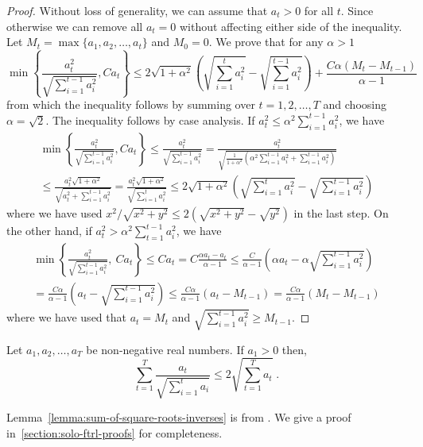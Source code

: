 \begin{proof}
Without loss of generality, we can assume that $a_t > 0$ for all $t$. Since otherwise we
can remove all $a_t = 0$ without affecting either side of the inequality. Let $M_t = \max\{a_1, a_2, \dots, a_t\}$ and $M_0 = 0$.
We prove that for any $\alpha > 1$
$$
\min\left\{ \frac{a_t^2}{\sqrt{\sum_{i=1}^{t-1} a_i^2}}, C a_t \right\}
\le 2 \sqrt{1+\alpha^2} \left( \sqrt{\sum_{i=1}^t a_i^2} - \sqrt{\sum_{i=1}^{t-1} a_i^2} \right) + \frac{C\alpha( M_t  - M_{t-1})}{\alpha - 1}
$$
from which the inequality follows by summing over $t=1,2,\dots,T$ and choosing $\alpha = \sqrt{2}$.
The inequality follows by case analysis. If $a_t^2 \le \alpha^2 \sum_{i=1}^{t-1} a_i^2$, we have
\begin{multline*}
\min\left\{ \frac{a_t^2}{\sqrt{\sum_{i=1}^{t-1} a_i^2}}, C a_t \right\}
\le \frac{a_t^2}{\sqrt{\sum_{i=1}^{t-1} a_i^2}}
= \frac{a_t^2}{\sqrt{\frac{1}{1+\alpha^2} \left( \alpha^2 \sum_{i=1}^{t-1} a_i^2 + \sum_{i=1}^{t-1} a_i^2 \right)}} \\
\le \frac{a_t^2\sqrt{1+\alpha^2}}{\sqrt{ a_t^2 + \sum_{i=1}^{t-1} a_i^2 }}
= \frac{a_t^2\sqrt{1+\alpha^2}}{\sqrt{\sum_{i=1}^t a_i^2}}
\le 2\sqrt{1+\alpha^2} \left( \sqrt{\sum_{i=1}^t a_i^2} - \sqrt{\sum_{i=1}^{t-1} a_i^2} \right)
\end{multline*}
where we have used $x^2/\sqrt{x^2+y^2} \le 2(\sqrt{x^2+y^2} - \sqrt{y^2})$ in the last step.
On the other hand, if $a_t^2 > \alpha^2 \sum_{t=1}^{t-1} a_i^2$, we have
\begin{multline*}
\min\left\{ \frac{a_t^2}{\sqrt{\sum_{i=1}^{t-1} a_i^2}}, \ C a_t \right\}
\le C a_t
= C \frac{\alpha a_t  - a_t}{\alpha - 1}
\le \frac{C}{\alpha - 1} \left( \alpha a_t  - \alpha \sqrt{\sum_{i=1}^{t-1} a_i^2} \right) \\
= \frac{C\alpha}{\alpha - 1} \left( a_t  - \sqrt{\sum_{i=1}^{t-1} a_i^2} \right)
\le \frac{C\alpha}{\alpha - 1} \left( a_t  - M_{t-1} \right)
= \frac{C\alpha}{\alpha - 1} \left( M_t  - M_{t-1} \right)
\end{multline*}
where we have used that $a_t = M_t$ and $\sqrt{\sum_{i=1}^{t-1} a_i^2} \ge M_{t-1}$.
\end{proof}

\begin{lemma}
\label{lemma:sum-of-square-roots-inverses}
Let $a_1, a_2, \dots, a_T$ be non-negative real numbers. If $a_1 > 0$ then,
$$
\sum_{t=1}^T \frac{a_t}{\sqrt{\sum_{i=1}^t a_i}} \le 2 \sqrt{\sum_{t=1}^T a_t} \; .
$$
\end{lemma}
%
Lemma~\ref{lemma:sum-of-square-roots-inverses} is from
\cite[Lemma~3.5]{Auer-Cesa-Bianchi-Gentile-2002}.  We give a proof
in~\ref{section:solo-ftrl-proofs} for completeness.

